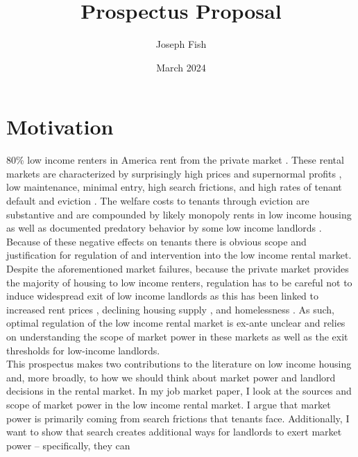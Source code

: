 \documentclass{article}
\title{Prospectus Proposal}
\author{Joseph Fish}
\date{March 2024}
\begin{document}
\section{Motivation}

80\% low income renters in America rent from the private market \parencite{jchs_2024, nhpd2024profiles}. These rental markets are characterized by surprisingly high prices and supernormal profits \parencite{Desmond_2019, Damen_2025,Eisfeldt_2015}, low maintenance, minimal entry, high search frictions, and high rates of tenant default \parencite{humphries-2024} and eviction \parencite{Gromis-et-al-2022}. The welfare costs to tenants through eviction are substantive \parencite{collison-et-al-2023, graetz-at-al-2023, desmond-evicted, humphries2025} and are compounded by likely monopoly rents in low income housing as well as documented predatory behavior by some low income landlords \parencite{desmond-evicted}. Because of these negative effects on tenants there is obvious scope and justification for regulation of and intervention into the low income rental market.\\

Despite the aforementioned market failures, because the private market provides the majority of housing to low income renters, regulation has to be careful not to induce widespread exit of low income landlords as this has been linked to increased rent prices \parencite{collinson2024eviction}, declining housing supply \parencite{diamond-2019}, and homelessness \parencite{pinto2024sro}. As such, optimal regulation of the low income rental market is ex-ante unclear and relies on understanding the scope of market power in these markets as well as the exit thresholds for low-income landlords.\\   

This prospectus makes two contributions to the literature on low income housing and, more broadly, to how we should think about market power and landlord decisions in the rental market. In my job market paper, I look at the sources and scope of market power in the low income rental market. I argue that market power is primarily coming from search frictions that tenants face. Additionally, I want to show that search creates additional ways for landlords to exert market power -- specifically, they can
\end{document}
